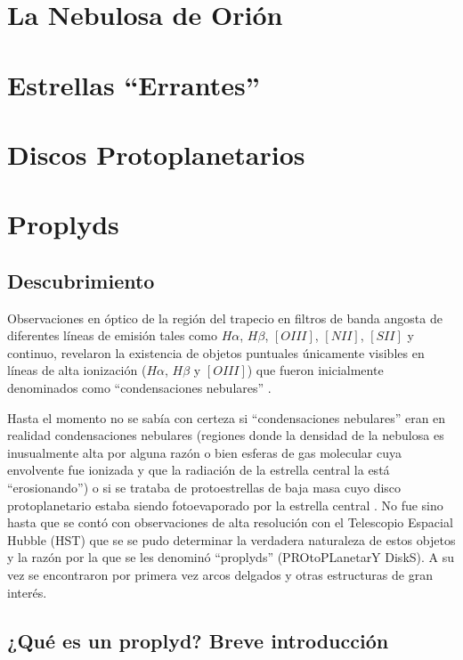 \section{La Nebulosa de Orión}
\section{Estrellas ``Errantes''}
\section{Discos Protoplanetarios}
\section{Proplyds}
\subsection{Descubrimiento}
Observaciones en óptico de la región del trapecio en filtros de banda
angosta de diferentes líneas de emisión tales como $H\alpha$, $H\beta$,
$[OIII]$, $[NII]$, $[SII]$ y continuo, revelaron la existencia de
objetos puntuales únicamente visibles en líneas de alta ionización
($H\alpha$, $H\beta$ y $[OIII]$) que fueron inicialmente denominados como
``condensaciones nebulares'' \citep{Laques:1979}. 

Hasta el momento no se sabía con certeza si ``condensaciones nebulares''
eran en realidad condensaciones nebulares (regiones donde la densidad de
la nebulosa es inusualmente alta por alguna razón o bien esferas de gas
molecular cuya envolvente fue ionizada y que la radiación de la estrella
central la está ``erosionando'') o si se trataba de protoestrellas
de baja masa cuyo disco protoplanetario estaba siendo fotoevaporado por
la estrella central \citep{churchwell:1987}. No fue sino hasta que se contó
con observaciones de alta resolución con el Telescopio Espacial Hubble (HST)
que se se pudo determinar la verdadera naturaleza de estos objetos
\citep{ODell:1993} y la razón por la que se les denominó ``proplyds''
(PROtoPLanetarY DiskS). A su vez se encontraron por primera vez arcos
delgados y otras estructuras de gran interés.

\subsection{¿Qué es un proplyd? Breve introducción \citep{Johnstone:1998}}

